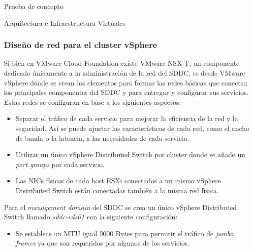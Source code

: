 \begin{section}{Prueba de concepto}
\begin{subsection}{Arquitectura e Infraestructura Virtuales\cite{CFVirtInfraes}}
\subsubsection{Diseño de red para el cluster vSphere}
Si bien en VMware Cloud Foundation existe VMware NSX-T, un componente dedicado únicamente a la administración de la red del SDDC, es desde VMware vSphere dónde se crean los elementos para formar las redes básicas que conectan los principales componentes del SDDC y para entregar y configurar sus servicios. Estas redes se configuran en base a los siguientes aspectos: 
\begin{itemize}
    \item Separar el tráfico de cada servicio para mejorar la eficiencia de la red y la seguridad. Así se puede ajustar las características de cada red, como el ancho de banda o la latencia, a las necesidades de cada servicio.
    \item Utilizar un único vSphere Distributed Switch por cluster donde se añade un \textit{port groups} por cada servicio.
    \item Las NICs físicas de cada host ESXi conectados a un mismo vSphere Distributed Switch están conectadas también a la misma red física.
\end{itemize}
Para el \textit{management domain} del SDDC se crea un único vSphere Distributed Switch llamado \textit{sddc-vds01} con la siguiente configuración:
\begin{itemize}
    
    \item Se establece un MTU igual 9000 Bytes para permitir el tráfico de \textit{jumbo frames} ya que son requeridos por algunos de los servicios.
    

\end{itemize}
\end{subsection}
\end{section}
